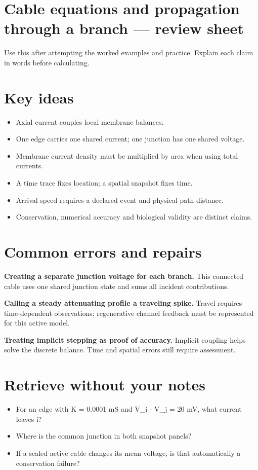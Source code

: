 \documentclass[11pt,letterpaper]{article}
\theoremstyle{definition}\newtheorem{definition}{Definition}\newtheorem{example}{Example}
\numberwithin{equation}{section}
\begin{document}
\section*{Cable equations and propagation through a branch --- review sheet}
Use this after attempting the worked examples and practice. Explain each claim in words before calculating.

\section*{Key ideas}
\begin{itemize}
\item Axial current couples local membrane balances.
\item One edge carries one shared current; one junction has one shared voltage.
\item Membrane current density must be multiplied by area when using total currents.
\item A time trace fixes location; a spatial snapshot fixes time.
\item Arrival speed requires a declared event and physical path distance.
\item Conservation, numerical accuracy and biological validity are distinct claims.
\end{itemize}
\section*{Common errors and repairs}
\textbf{Creating a separate junction voltage for each branch.} This connected cable uses one shared junction state and sums all incident contributions.

\textbf{Calling a steady attenuating profile a traveling spike.} Travel requires time-dependent observations; regenerative channel feedback must be represented for this active model.

\textbf{Treating implicit stepping as proof of accuracy.} Implicit coupling helps solve the discrete balance. Time and spatial errors still require assessment.

\section*{Retrieve without your notes}
\begin{itemize}
\item For an edge with K =\allowbreak{} 0.0001 mS and V\_i - V\_j =\allowbreak{} 20 mV, what current leaves i?
\item Where is the common junction in both snapshot panels?
\item If a sealed active cable changes its mean voltage, is that automatically a conservation failure?
\end{itemize}
\end{document}
